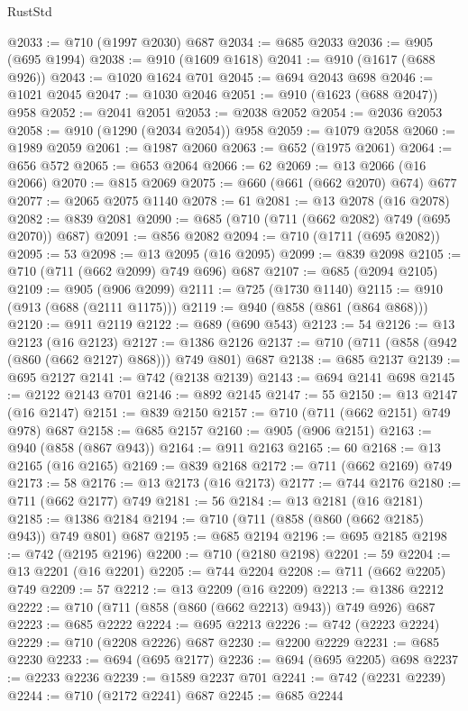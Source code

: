 \begin{lexlean}{RustStd}
\begin{coremodule}
@2033 := @710 (@1997 @2030) @687
@2034 := @685 @2033
@2036 := @905 (@695 @1994)
@2038 := @910 (@1609 @1618)
@2041 := @910 (@1617 (@688 @926))
@2043 := @1020 @1624 @701
@2045 := @694 @2043 @698
@2046 := @1021 @2045
@2047 := @1030 @2046
@2051 := @910 (@1623 (@688 @2047)) @958
@2052 := @2041 @2051
@2053 := @2038 @2052
@2054 := @2036 @2053
@2058 := @910 (@1290 (@2034 @2054)) @958
@2059 := @1079 @2058
@2060 := @1989 @2059
@2061 := @1987 @2060
@2063 := @652 (@1975 @2061)
@2064 := @656 @572
@2065 := @653 @2064
@2066 := 62
@2069 := @13 @2066 (@16 @2066)
@2070 := @815 @2069
@2075 := @660 (@661 (@662 @2070) @674) @677
@2077 := @2065 @2075 @1140
@2078 := 61
@2081 := @13 @2078 (@16 @2078)
@2082 := @839 @2081
@2090 := @685 (@710 (@711 (@662 @2082) @749 (@695 @2070)) @687)
@2091 := @856 @2082
@2094 := @710 (@1711 (@695 @2082))
@2095 := 53
@2098 := @13 @2095 (@16 @2095)
@2099 := @839 @2098
@2105 := @710 (@711 (@662 @2099) @749 @696) @687
@2107 := @685 (@2094 @2105)
@2109 := @905 (@906 @2099)
@2111 := @725 (@1730 @1140)
@2115 := @910 (@913 (@688 (@2111 @1175)))
@2119 := @940 (@858 (@861 (@864 @868)))
@2120 := @911 @2119
@2122 := @689 (@690 @543)
@2123 := 54
@2126 := @13 @2123 (@16 @2123)
@2127 := @1386 @2126
@2137 := @710 (@711 (@858 (@942 (@860 (@662 @2127) @868))) @749 @801) @687
@2138 := @685 @2137
@2139 := @695 @2127
@2141 := @742 (@2138 @2139)
@2143 := @694 @2141 @698
@2145 := @2122 @2143 @701
@2146 := @892 @2145
@2147 := 55
@2150 := @13 @2147 (@16 @2147)
@2151 := @839 @2150
@2157 := @710 (@711 (@662 @2151) @749 @978) @687
@2158 := @685 @2157
@2160 := @905 (@906 @2151)
@2163 := @940 (@858 (@867 @943))
@2164 := @911 @2163
@2165 := 60
@2168 := @13 @2165 (@16 @2165)
@2169 := @839 @2168
@2172 := @711 (@662 @2169) @749
@2173 := 58
@2176 := @13 @2173 (@16 @2173)
@2177 := @744 @2176
@2180 := @711 (@662 @2177) @749
@2181 := 56
@2184 := @13 @2181 (@16 @2181)
@2185 := @1386 @2184
@2194 := @710 (@711 (@858 (@860 (@662 @2185) @943)) @749 @801) @687
@2195 := @685 @2194
@2196 := @695 @2185
@2198 := @742 (@2195 @2196)
@2200 := @710 (@2180 @2198)
@2201 := 59
@2204 := @13 @2201 (@16 @2201)
@2205 := @744 @2204
@2208 := @711 (@662 @2205) @749
@2209 := 57
@2212 := @13 @2209 (@16 @2209)
@2213 := @1386 @2212
@2222 := @710 (@711 (@858 (@860 (@662 @2213) @943)) @749 @926) @687
@2223 := @685 @2222
@2224 := @695 @2213
@2226 := @742 (@2223 @2224)
@2229 := @710 (@2208 @2226) @687
@2230 := @2200 @2229
@2231 := @685 @2230
@2233 := @694 (@695 @2177)
@2236 := @694 (@695 @2205) @698
@2237 := @2233 @2236
@2239 := @1589 @2237 @701
@2241 := @742 (@2231 @2239)
@2244 := @710 (@2172 @2241) @687
@2245 := @685 @2244

\end{coremodule}
\end{lexlean}
